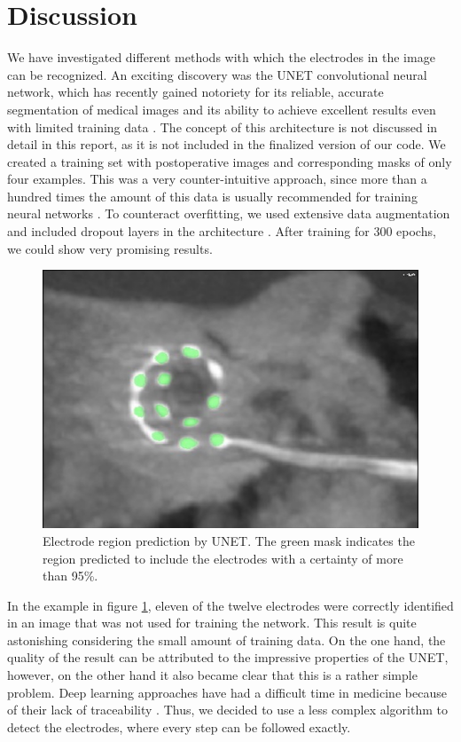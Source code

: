 \documentclass[a4paper, 10pt, twocolumn]{article}
\begin{document}
\section{Discussion}
We have investigated different methods with which the electrodes in the image can be recognized. An exciting discovery was the UNET convolutional neural network, which has recently gained notoriety for its reliable, accurate segmentation of medical images and its ability to achieve excellent results even with limited training data \cite{ronneberger_u-net_2015}. The concept of this architecture is not discussed in detail in this report, as it is not included in the finalized version of our code. We created a training set with postoperative images and corresponding masks of only four examples. This was a very counter-intuitive approach, since more than a hundred times the amount of this data is usually recommended for training neural networks \cite{hestness_deep_2017,foody_effect_1995}. To counteract overfitting, we used extensive data augmentation and included dropout layers in the architecture \cite{wu_towards_2015}. After training for 300 epochs, we could show very promising results.



\begin{figure}[ht]
	\centering
  \includegraphics[width=.5\textwidth]{UNET.jpg}
	\caption{Electrode region prediction by UNET. The green mask indicates the region predicted to include the electrodes with a certainty of more than 95\%.}
	\label{UNET}
\end{figure}

In the example in figure \ref{UNET}, eleven of the twelve electrodes were correctly identified in an image that was not used for training the network. This result is quite astonishing considering the small amount of training data. On the one hand, the quality of the result can be attributed to the impressive properties of the UNET, however, on the other hand it also became clear that this is a rather simple problem. Deep learning approaches have had a difficult time in medicine because of their lack of traceability \cite{litjens_survey_2017}. Thus, we decided to use a less complex algorithm to detect the electrodes, where every step can be followed exactly. 
\end{document}
